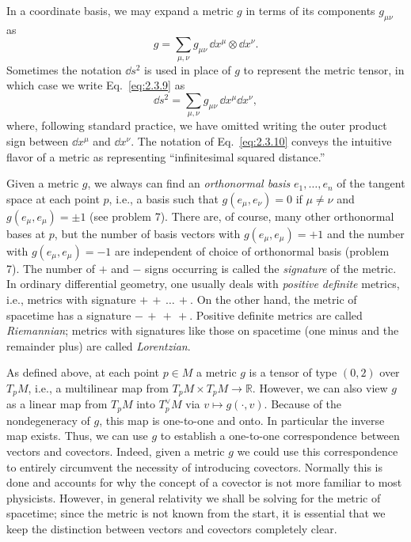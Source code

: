 In a coordinate basis, we may expand a metric \(g\) in terms of its components
\(g_{\mu\nu}\) as
\begin{equation}
  g=\sum_{\mu,\nu}g_{\mu\nu}\,\dd x^\mu\otimes \dd x^\nu .
  \tag{2.3.9}\label{eq:2.3.9}
\end{equation}
Sometimes the notation \(\dd s^2\) is used in place of \(g\) to represent the metric
tensor, in which case we write Eq.~\eqref{eq:2.3.9} as
\begin{equation}
  \dd s^2=\sum_{\mu,\nu}g_{\mu\nu}\,\dd x^\mu \dd x^\nu ,
  \tag{2.3.10}\label{eq:2.3.10}
\end{equation}
where, following standard practice, we have omitted writing the outer product sign
between \(\dd x^\mu\) and \(\dd x^\nu\).  The notation of Eq.~\eqref{eq:2.3.10}
conveys the intuitive flavor of a metric as representing ``infinitesimal squared
distance.''

Given a metric \(g\), we always can find an \emph{orthonormal basis}
\(e_1,\ldots,e_n\) of the tangent space at each point \(p\), i.e., a basis such that
\(g(e_\mu,e_\nu)=0\) if \(\mu\ne\nu\) and \(g(e_\mu,e_\mu)=\pm1\) (see problem
7).  There are, of course, many other orthonormal bases at \(p\), but the number of
basis vectors with \(g(e_\mu,e_\mu)=+1\) and the number with
\(g(e_\mu,e_\mu)=-1\) are independent of choice of orthonormal basis (problem 7).
The number of \(+\) and \(-\) signs occurring is called the \emph{signature} of the
metric.  In ordinary differential geometry, one usually deals with \emph{positive
definite} metrics, i.e., metrics with signature \(+\,+\,\ldots\,+\).  On the other
hand, the metric of spacetime has a signature \(-\,+\,+\,+\).  Positive definite
metrics are called \emph{Riemannian}; metrics with signatures like those on
spacetime (one minus and the remainder plus) are called \emph{Lorentzian}.

As defined above, at each point \(p\in M\) a metric \(g\) is a tensor of type
\((0,2)\) over \(T_pM\), i.e., a multilinear map from
\(T_pM\times T_pM\to\mathbb{R}\).  However, we can also view \(g\) as a linear
map from \(T_pM\) into \(T_p^\vee M\) via \(v\mapsto g(\mathord\cdot,v)\).  Because
of the nondegeneracy of \(g\), this map is one-to-one and onto.  In particular the
inverse map exists.  Thus, we can use \(g\) to establish a one-to-one correspondence
between vectors and covectors.  Indeed, given a metric \(g\) we could use this
correspondence to entirely circumvent the necessity of introducing covectors.
Normally this is done and accounts for why the concept of a covector is not more
familiar to most physicists.  However, in general relativity we shall be solving for
the metric of spacetime; since the metric is not known from the start, it is essential
that we keep the distinction between vectors and covectors completely clear.
